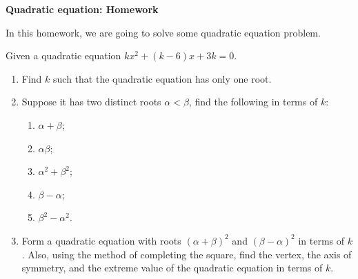 \documentclass[12pt]{article}
\begin{document}
    \begin{center}
        \textbf{Quadratic equation: Homework}
    \end{center}

    In this homework, we are going to solve some quadratic equation problem.

    Given a quadratic equation $kx^2+(k-6)x+3k=0$.\begin{enumerate}
        \item Find $k$ such that the quadratic equation has only one root.
        \item Suppose it has two distinct roots $\alpha<\beta$, find the following in terms of $k$:\begin{enumerate}
            \item $\alpha+\beta$;
            \item $\alpha\beta$;
            \item $\alpha^2+\beta^2$;
            \item $\beta-\alpha$;
            \item $\beta^2-\alpha^2$.
        \end{enumerate}
        \item Form a quadratic equation with roots $(\alpha+\beta)^2$ and $(\beta-\alpha)^2$ in terms of $k$. Also, using the method of completing the square, find the vertex, the axis of symmetry, and the extreme value of the quadratic equation in terms of $k$.
    \end{enumerate}
\end{document}
